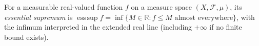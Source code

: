 
For a measurable real-valued function $f$ on a measure space $(X,\mathcal F,\mu)$, its \emph{essential supremum} is $\operatorname*{ess\,sup}f=\inf\{M\in\mathbb R:f\le M\text{ almost everywhere}\}$, with the infimum interpreted in the extended real line (including $+\infty$ if no finite bound exists).
